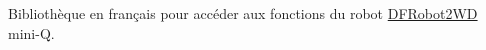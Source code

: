 Bibliothèque en français pour accéder aux fonctions du robot \hyperlink{class_d_f_robot2_w_d}{D\-F\-Robot2\-W\-D} mini-\/\-Q. 